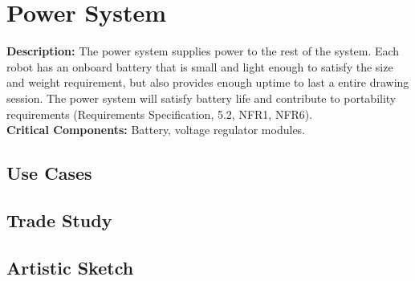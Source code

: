 
\section{Power System}
\label{sec:power_system}
\textbf{Description:} The power system supplies power to the rest of the system. Each robot has an onboard battery that is small and light enough to satisfy the size and weight requirement, but also provides enough uptime to last a entire drawing session. The power system will satisfy battery life and contribute to portability requirements (Requirements Specification, 5.2, NFR1, NFR6). \\
\textbf{Critical Components:} Battery, voltage regulator modules. \\

\subsection{Use Cases}

\subsection{Trade Study}

\subsection{Artistic Sketch}